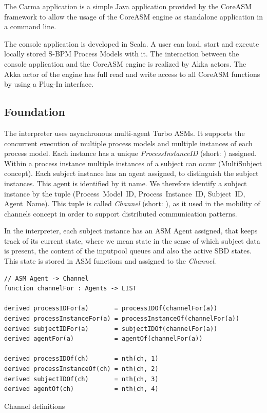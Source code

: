 The Carma application is a simple Java application provided by the CoreASM framework
to allow the usage of the CoreASM engine as standalone application in a command line.

The console application is developed in Scala.
A user can load, start and execute locally stored S-BPM Process Models with it.
The interaction between the console application and the CoreASM engine is realized by Akka actors.
The Akka actor of the engine has full read and write access to all CoreASM functions by using a Plug-In interface.




\subsection{Foundation}

The interpreter uses asynchronous multi-agent Turbo ASMs.
It supports the concurrent execution of multiple process models and multiple instances of each process model.
Each instance has a unique \textit{ProcessInstanceID} (short: ) assigned.
Within a process instance multiple instances of a subject can occur (MultiSubject concept).
Each subject instance has an agent assigned, to distinguish the subject instances.
This agent is identified by it name.
We therefore identify a subject instance by the tuple (Process~Model~ID, Process~Instance~ID, Subject~ID, Agent~Name).
This tuple is called \textit{Channel} (short: ), as it used in the mobility of channels concept in order to support distributed communication patterns.

In the interpreter, each subject instance has an ASM Agent assigned, that keeps track of its current state,
where we mean state in the sense of which subject data is present, the content of the inputpool queues and also the active SBD states.
This state is stored in ASM functions and assigned to the \textit{Channel}.

\begin{listing}[htbp]
\begin{verbatim}
// ASM Agent -> Channel
function channelFor : Agents -> LIST

derived processIDFor(a)       = processIDOf(channelFor(a))
derived processInstanceFor(a) = processInstanceOf(channelFor(a))
derived subjectIDFor(a)       = subjectIDOf(channelFor(a))
derived agentFor(a)           = agentOf(channelFor(a))

derived processIDOf(ch)       = nth(ch, 1)
derived processInstanceOf(ch) = nth(ch, 2)
derived subjectIDOf(ch)       = nth(ch, 3)
derived agentOf(ch)           = nth(ch, 4)
\end{verbatim}
\caption{Channel definitions}
\label{lst:shortasm:channelFor}
\end{listing}

